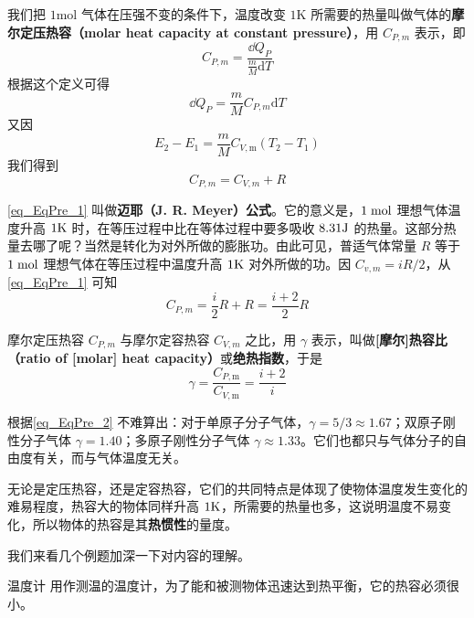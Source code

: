 我们把 $1\mathrm{mol}$ 气体在压强不变的条件下，温度改变 $1\mathrm K$ 所需要的热量叫做气体的\textbf{摩尔定压热容（molar heat capacity at constant pressure）}，用 $C_{P,m}$ 表示，即
\begin{equation}
C_{P, {m}}=\frac{\dd Q_{P}}{\frac{m}{M} \mathrm{d} T}
\end{equation}
根据这个定义可得
\begin{equation}
\dd Q_{P}=\frac{m}{M} C_{P, {m}} \mathrm{d} T
\end{equation}
又因
\begin{equation}
E_{2}-E_{1}=\frac{m}{M} C_{V, \mathrm{m}}\left(T_{2}-T_{1}\right)
\end{equation}
我们得到
\begin{equation} \label{eq_EqPre_1}
C_{P, m}=C_{V, m}+R
\end{equation}

\autoref{eq_EqPre_1} 叫做\textbf{迈耶（J. R. Meyer）公式}。它的意义是，$1\; \rm mol$ 理想气体温度升高 $1\rm K$ 时，在等压过程中比在等体过程中要多吸收 $8. 31\rm J $ 的热量。这部分热量去哪了呢？当然是转化为对外所做的膨胀功。由此可见，普适气体常量 $R$ 等于 $1\;\rm mol$ 理想气体在等压过程中温度升高 $1\rm K$ 对外所做的功。因 $C_{v, m}=iR/2$，从\autoref{eq_EqPre_1} 可知
\begin{equation}
C_{P, {m}}=\frac{i}{2} R+R=\frac{i+2}{2} R
\end{equation}

摩尔定压热容 $C_{P,m}$ 与摩尔定容热容 $C_{V,m}$ 之比，用 $\gamma$ 表示，叫做\textbf{[摩尔]热容比（ratio of [molar] heat capacity）}或\textbf{绝热指数}，于是
\begin{equation} \label{eq_EqPre_2}
\gamma=\frac{C_{P, \mathrm{m}}}{C_{V, \mathrm{m}}}=\frac{i+2}{i}
\end{equation}

根据\autoref{eq_EqPre_2} 不难算出：对于单原子分子气体，$\gamma=5/3\approx 1.67$；双原子刚性分子气体 $\gamma=1.40$；多原子刚性分子气体 $\gamma\approx 1. 33 $。它们也都只与气体分子的自由度有关，而与气体温度无关。

无论是定压热容，还是定容热容，它们的共同特点是体现了使物体温度发生变化的难易程度，热容大的物体同样升高 $1\rm K$，所需要的热量也多，这说明温度不易变化，所以物体的热容是其\textbf{热惯性}的量度。

我们来看几个例题加深一下对内容的理解。

\begin{example}{温度计}
用作测温的温度计，为了能和被测物体迅速达到热平衡，它的热容必须很小。
\end{example}

